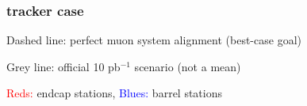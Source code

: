 \documentclass[compress]{beamer}
\begin{document}
\begin{frame}
\frametitle{ tracker case}
Dashed line: perfect muon system alignment (best-case goal)

Grey line: official 10 pb$^{-1}$ scenario (not a mean)

\vfill
{}

\vfill
\textcolor{red}{Reds:} endcap stations, \textcolor{blue}{Blues:} barrel stations
\end{frame}
\end{document}
